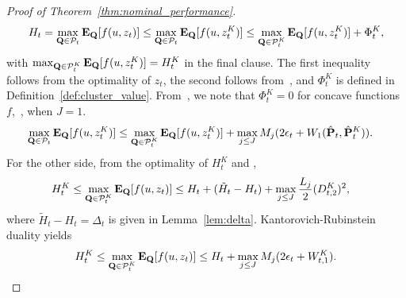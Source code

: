 \begin{proof}[Proof of Theorem~\ref{thm:nominal_performance}]
\begin{equation*}
    H_t = \max_{\mathbf{Q} \in \mathcal{P}_{t}} \mathbf{E}_{\mathbf{Q}}[f( u,z_t)] \leq \max_{\mathbf{Q} \in \mathcal{P}_{t}} \mathbf{E}_{\mathbf{Q}}[f(u, z^K_{t})] \leq \max_{\mathbf{Q} \in \mathcal{P}^K_{t}} \mathbf{E}_{\mathbf{Q}}[f(u, z^K_{t})]  + \Phi^K_{t},
\end{equation*}
with $\max_{\mathbf{Q} \in \mathcal{P}^K_{t}}\mathbf{E}_{\mathbf{Q}}[f(u, z^K_{t})] = H^K_t$ in the final clause. 
The first inequality follows from the optimality of $z_t$, the second follows from~\cite[Theorem 5]{mro}, 
and $\Phi^K_t$ is defined in Definition~\ref{def:cluster_value}.
From~\cite[Theorem 4]{mro}, we note that $\Phi^K_{t}=0$ for concave functions $f$,~\ie, when $J=1$.
\begin{equation*}
\begin{aligned}
        \max_{\mathbf{Q} \in \mathcal{P}_{t}} \mathbf{E}_{\mathbf{Q}}[f(u, z^K_{t})] &\leq  \max_{\mathbf{Q} \in \mathcal{P}^K_{t}} \mathbf{E}_{\mathbf{Q}}[f(u, z^K_{t})] + \max_{j\leq J}M_j(2\epsilon_{t} + W_1(\hat{{\mathbf P}}_{t},\hat{{\mathbf P}}^K_{t})).
    \end{aligned}
\end{equation*}
 For the other side, from the optimality of $H^K_t$ and \cite[Theorem 5]{mro},
\begin{equation*}
\begin{aligned}
    H^K_t \leq \max_{\mathbf{Q} \in \mathcal{P}^K_{t}} \mathbf{E}_{\mathbf{Q}}[f(u, z_{t})] &\leq  H_t + (\tilde{H}_t - H_t) + {\max_{j \leq J}\frac{L_j}{2}}(D^K_{t,2})^2,
\end{aligned}
\end{equation*}
where $\tilde{H}_t - H_t =\Delta_t$ is given in Lemma~\ref{lem:delta}. 
Kantorovich-Rubinstein duality yields 
\begin{equation*} H^K_t \leq \max_{\mathbf{Q} \in \mathcal{P}^K_{t}} \mathbf{E}_{\mathbf{Q}}[f(u, z_{t})] \leq H_t + \max_{j\leq J}M_j(2\epsilon_{t} +W^K_{t,1}).\end{equation*}

\end{proof}
